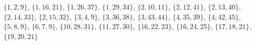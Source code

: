 $\{1,2,9\}$, $\{1,16,21\}$, $\{1,26,37\}$, $\{1,29,34\}$, $\{2,10,11\}$, $\{2,12,41\}$, $\{2,13,40\}$, $\{2,14,33\}$, $\{2,15,32\}$, $\{3,4,9\}$, $\{3,36,38\}$, $\{3,43,44\}$, $\{4,35,39\}$, $\{4,42,45\}$, $\{5,8,9\}$, $\{6,7,9\}$, $\{10,28,31\}$, $\{11,27,30\}$, $\{16,22,23\}$, $\{16,24,25\}$, $\{17,18,21\}$, $\{19,20,21\}$
